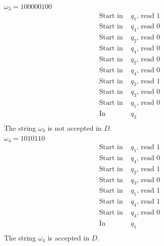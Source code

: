 \documentclass{article}
\begin{document}
$\omega_3=100000100$\\
\begin{equation*}
    \begin{split}
        \text{Start in } & q_1 \text{, read } 1\\
        \text{Start in } & q_4 \text{, read } 0\\
        \text{Start in } & q_2 \text{, read } 0\\
        \text{Start in } & q_4 \text{, read } 0\\
        \text{Start in } & q_2 \text{, read } 0\\
        \text{Start in } & q_4 \text{, read } 0\\
        \text{Start in } & q_2 \text{, read } 1\\
        \text{Start in } & q_3 \text{, read } 0\\
        \text{Start in } & q_1 \text{, read } 0\\
        \text{In } & q_3\\
    \end{split}
\end{equation*}
The string $\omega_3$ is not accepted in $D$.\\

$\omega_4=1010110$\\
\begin{equation*}
    \begin{split}
        \text{Start in } & q_1 \text{, read } 1\\
        \text{Start in } & q_4 \text{, read } 0\\
        \text{Start in } & q_2 \text{, read } 1\\
        \text{Start in } & q_3 \text{, read } 0\\
        \text{Start in } & q_1 \text{, read } 1\\
        \text{Start in } & q_4 \text{, read } 1\\
        \text{Start in } & q_3 \text{, read } 0\\
        \text{In } & q_1\\
    \end{split}
\end{equation*}
The string $\omega_4$ is accepted in $D$.\\
\end{document}
